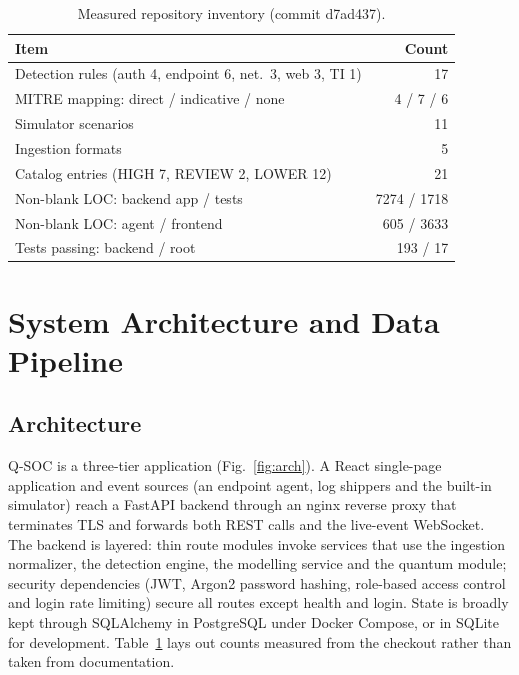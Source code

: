 \documentclass[conference]{IEEEtran}
\begin{document}
\begin{table}[t]
\caption{Measured repository inventory (commit d7ad437).}
\label{tab:inventory}
\centering
\footnotesize
\begin{tabular}{@{}l r@{}}
\toprule
Item & Count \\
\midrule
Detection rules (auth 4, endpoint 6, net.\ 3, web 3, TI 1) & 17 \\
MITRE mapping: direct / indicative / none & 4 / 7 / 6 \\
Simulator scenarios & 11 \\
Ingestion formats & 5 \\
Catalog entries (HIGH 7, REVIEW 2, LOWER 12) & 21 \\
Non-blank LOC: backend app / tests & 7274 / 1718 \\
Non-blank LOC: agent / frontend & 605 / 3633 \\
Tests passing: backend / root & 193 / 17 \\
\bottomrule
\end{tabular}
\end{table}

\section{System Architecture and Data Pipeline}\label{sec:arch}
\subsection{Architecture}
Q-SOC is a three-tier application (Fig.~\ref{fig:arch}). A React single-page application and event sources (an endpoint agent, log shippers and the built-in simulator) reach a FastAPI backend through an nginx reverse proxy that terminates TLS and forwards both REST calls and the live-event WebSocket. The backend is layered: thin route modules invoke services that use the ingestion normalizer, the detection engine, the modelling service and the quantum module; security dependencies (JWT, Argon2 password hashing, role-based access control and login rate limiting) secure all routes except health and login. State is broadly kept through SQLAlchemy in PostgreSQL under Docker Compose, or in SQLite for development. Table~\ref{tab:inventory} lays out counts measured from the checkout rather than taken from documentation.
\end{document}
